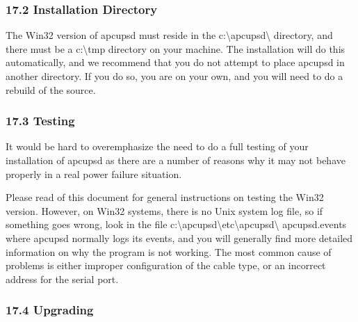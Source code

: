 \label{Installation-Directory}

\subsubsection*{17.2 Installation Directory}

\label{index-Windows_002c-Installation-Directory-172}
The Win32 version of apcupsd must reside in the
c:\textbackslash{}apcupsd\textbackslash{} directory, and there must be a
c:\textbackslash{}tmp directory on your machine. The installation will do this
automatically, and we recommend that you do not attempt to place apcupsd in
another directory. If you do so, you are on your own, and you will need to do
a rebuild of the source. 

\label{Testing}

\subsubsection*{17.3 Testing}

\label{index-Windows_002c-Testing-173}
\label{index-Testing_002c-Windows-174}
It would be hard to overemphasize the need to do a full testing of your
installation of apcupsd as there are a number of reasons why it may not behave
properly in a real power failure situation.  

Please read 
 of this document for
general instructions on testing the Win32 version. However, on Win32 systems,
there is no Unix system log file, so if something goes wrong, look in the file
c:\textbackslash{}apcupsd\textbackslash{}etc\textbackslash{}apcupsd\textbackslash
{}apcupsd.events where apcupsd normally logs its events, and you will
generally find more detailed information on why the program is not working.
The most common cause of problems is either improper configuration of the
cable type, or an incorrect address for the serial port. 

\label{Upgrading}

\subsubsection*{17.4 Upgrading}

